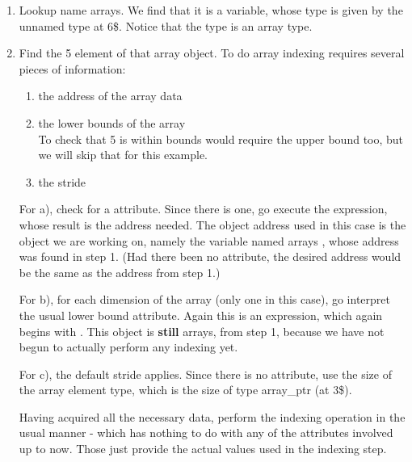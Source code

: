 \begin{enumerate}[1.]

\item Lookup name arrays. We find that it is a variable,
whose type is given by the unnamed type at 6\$. Notice that
the type is an array type.


\item Find the 5 element of that array object. To do array
indexing requires several pieces of information:

\begin{enumerate}[a]

\item  the address of the array data

\item the lower bounds of the array \\
\lbrack To check that 5 is within bounds would require the upper
bound too, but we will skip that for this example. \rbrack

\item the stride 

\end{enumerate}

For a), check for a  attribute. Since
there is one, go execute the expression, whose result is
the address needed. The object address used in this case
is the object we are working on, namely the variable named
arrays , whose address was found in step 1. (Had there been
no  attribute, the desired address would
be the same as the address from step 1.)

For b), for each dimension of the array (only one
in this case), go interpret the usual lower bound
attribute. Again this is an expression, which again begins
with . This object is 
\textbf{still} arrays,
from step 1, because we have not begun to actually perform
any indexing yet.

For c), the default stride applies. Since there is no
 attribute, use the size of the array element
type, which is the size of type array\_ptr (at 3\$).

Having acquired all the necessary data, perform the indexing
operation in the usual manner -  which has nothing to do with
any of the attributes involved up to now. Those just provide
the actual values used in the indexing step.


\end{enumerate}

